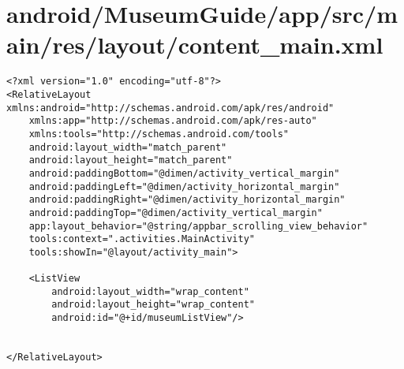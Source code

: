 \section{android/MuseumGuide/app/src/main/res/layout/content_main.xml}
\begin{lstlisting}<?xml version="1.0" encoding="utf-8"?>
<RelativeLayout xmlns:android="http://schemas.android.com/apk/res/android"
    xmlns:app="http://schemas.android.com/apk/res-auto"
    xmlns:tools="http://schemas.android.com/tools"
    android:layout_width="match_parent"
    android:layout_height="match_parent"
    android:paddingBottom="@dimen/activity_vertical_margin"
    android:paddingLeft="@dimen/activity_horizontal_margin"
    android:paddingRight="@dimen/activity_horizontal_margin"
    android:paddingTop="@dimen/activity_vertical_margin"
    app:layout_behavior="@string/appbar_scrolling_view_behavior"
    tools:context=".activities.MainActivity"
    tools:showIn="@layout/activity_main">

    <ListView
        android:layout_width="wrap_content"
        android:layout_height="wrap_content"
        android:id="@+id/museumListView"/>


</RelativeLayout>
\end{lstlisting}
\newpage

